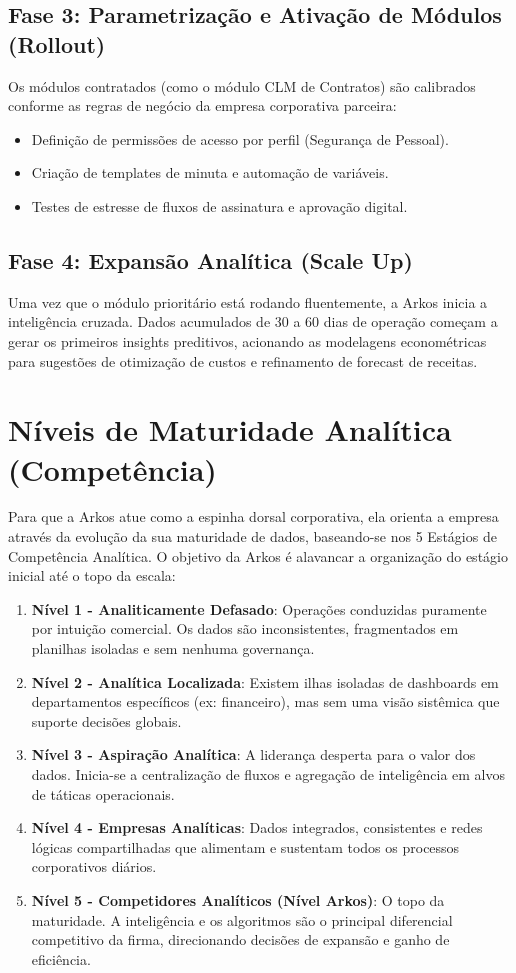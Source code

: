 \subsection{Fase 3: Parametrização e Ativação de Módulos (Rollout)}
Os módulos contratados (como o módulo CLM de Contratos) são calibrados conforme as regras de negócio da empresa corporativa parceira:
\begin{itemize}
    \item Definição de permissões de acesso por perfil (Segurança de Pessoal).
    \item Criação de templates de minuta e automação de variáveis.
    \item Testes de estresse de fluxos de assinatura e aprovação digital.
\end{itemize}

\subsection{Fase 4: Expansão Analítica (Scale Up)}
Uma vez que o módulo prioritário está rodando fluentemente, a Arkos inicia a inteligência cruzada. Dados acumulados de 30 a 60 dias de operação começam a gerar os primeiros insights preditivos, acionando as modelagens econométricas para sugestões de otimização de custos e refinamento de forecast de receitas.

\section{Níveis de Maturidade Analítica (Competência)}
Para que a Arkos atue como a espinha dorsal corporativa, ela orienta a empresa através da evolução da sua maturidade de dados, baseando-se nos 5 Estágios de Competência Analítica. O objetivo da Arkos é alavancar a organização do estágio inicial até o topo da escala:

\begin{enumerate}
    \item \textbf{Nível 1 - Analiticamente Defasado}: Operações conduzidas puramente por intuição comercial. Os dados são inconsistentes, fragmentados em planilhas isoladas e sem nenhuma governança.
    \item \textbf{Nível 2 - Analítica Localizada}: Existem ilhas isoladas de dashboards em departamentos específicos (ex: financeiro), mas sem uma visão sistêmica que suporte decisões globais.
    \item \textbf{Nível 3 - Aspiração Analítica}: A liderança desperta para o valor dos dados. Inicia-se a centralização de fluxos e agregação de inteligência em alvos de táticas operacionais.
    \item \textbf{Nível 4 - Empresas Analíticas}: Dados integrados, consistentes e redes lógicas compartilhadas que alimentam e sustentam todos os processos corporativos diários.
    \item \textbf{Nível 5 - Competidores Analíticos (Nível Arkos)}: O topo da maturidade. A inteligência e os algoritmos são o principal diferencial competitivo da firma, direcionando decisões de expansão e ganho de eficiência.
\end{enumerate}

